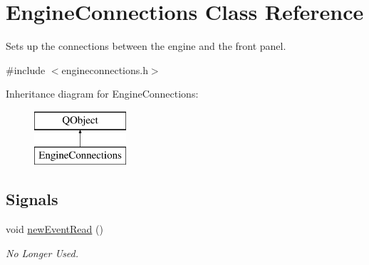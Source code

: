 \hypertarget{class_engine_connections}{\section{Engine\-Connections Class Reference}
\label{class_engine_connections}
}


Sets up the connections between the engine and the front panel.  




{\ttfamily \#include $<$engineconnections.\-h$>$}

Inheritance diagram for Engine\-Connections\-:\begin{figure}[H]
\begin{center}
\leavevmode
\includegraphics[height=2.000000cm]{class_engine_connections}
\end{center}
\end{figure}
\subsection*{Signals}
\begin{DoxyCompactItemize}
\item 
\hypertarget{class_engine_connections_ac76e805b02421bb343e738898d8a8949}{void \hyperlink{class_engine_connections_ac76e805b02421bb343e738898d8a8949}{new\-Event\-Read} ()}\label{class_engine_connections_ac76e805b02421bb343e738898d8a8949}

\begin{DoxyCompactList}\small\item\em No Longer Used. \end{DoxyCompactList}\end{DoxyCompactItemize}
